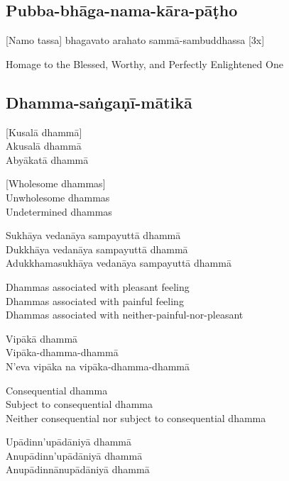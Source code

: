 \subsection{Pubba-bhāga-nama-kāra-pāṭho}
\label{pubba-bhaga-nama-kara-patho}
[Namo tassa] bhagavato arahato sammā-sambuddhassa \hfill{[3x]}

\begin{english}
  Homage to the Blessed, Worthy, and Perfectly Enlightened One
\end{english}

\subsection{Dhamma-saṅgaṇī-mātikā}
\label{dhamma-sangani-matika}
[Kusalā dhammā]\\
Akusalā dhammā\\
Abyākatā dhammā

\begin{english}
  [Wholesome dhammas]\\
  Unwholesome dhammas\\
  Undetermined dhammas
\end{english}

Sukhāya vedanāya sampayuttā dhammā\\
Dukkhāya vedanāya sampayuttā dhammā\\
Adukkhamasukhāya vedanāya sampayuttā dhammā

\begin{english}
  Dhammas associated with pleasant feeling\\
  Dhammas associated with painful feeling\\
  Dhammas associated with neither-painful-nor-pleasant
\end{english}

Vipākā dhammā\\
Vipāka-dhamma-dhammā\\
N'eva vipāka na vipāka-dhamma-dhammā

\begin{english}
  Consequential dhamma\\
  Subject to consequential dhamma\\
  Neither consequential nor subject to consequential dhamma
\end{english}

Upādinn'upādāniyā dhammā\\
Anupādinn'upādāniyā dhammā\\
Anupādinnānupādāniyā dhammā

